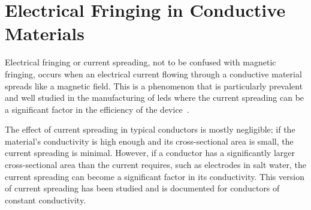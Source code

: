 
\section{Electrical Fringing in Conductive Materials}

Electrical fringing or current spreading, not to be confused with magnetic fringing, occurs when an electrical current flowing through a conductive material spreads like a magnetic field.
This is a phenomenon that is particularly prevalent and well studied in the manufacturing of \glspl{led} where the current spreading can be a significant factor in the efficiency of the device~\cite{solomentsev_LED_current_spreading_2022, hwang_LED_current_spreading_2008, jeon_LED_current_spreading_2001}.

The effect of current spreading in typical conductors is mostly negligible; if the material's conductivity is high enough and its cross-sectional area is small, the current spreading is minimal.
However, if a conductor has a significantly larger cross-sectional area than the current requires, such as electrodes in salt water, the current spreading can become a significant factor in its conductivity.
This version of current spreading has been studied and is documented for conductors of constant conductivity.~\cite{jason_current_spreading_long_objects_2008}

